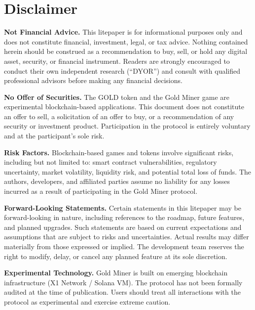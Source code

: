 \documentclass[11pt,a4paper]{article}
\begin{document}
\section*{Disclaimer}

\vspace{1em}

\noindent\textbf{Not Financial Advice.} This litepaper is for informational purposes only and does not constitute financial, investment, legal, or tax advice. Nothing contained herein should be construed as a recommendation to buy, sell, or hold any digital asset, security, or financial instrument. Readers are strongly encouraged to conduct their own independent research (``DYOR'') and consult with qualified professional advisors before making any financial decisions.

\vspace{0.8em}

\noindent\textbf{No Offer of Securities.} The GOLD token and the Gold Miner game are experimental blockchain-based applications. This document does not constitute an offer to sell, a solicitation of an offer to buy, or a recommendation of any security or investment product. Participation in the protocol is entirely voluntary and at the participant's sole risk.

\vspace{0.8em}

\noindent\textbf{Risk Factors.} Blockchain-based games and tokens involve significant risks, including but not limited to: smart contract vulnerabilities, regulatory uncertainty, market volatility, liquidity risk, and potential total loss of funds. The authors, developers, and affiliated parties assume no liability for any losses incurred as a result of participating in the Gold Miner protocol.

\vspace{0.8em}

\noindent\textbf{Forward-Looking Statements.} Certain statements in this litepaper may be forward-looking in nature, including references to the roadmap, future features, and planned upgrades. Such statements are based on current expectations and assumptions that are subject to risks and uncertainties. Actual results may differ materially from those expressed or implied. The development team reserves the right to modify, delay, or cancel any planned feature at its sole discretion.

\vspace{0.8em}

\noindent\textbf{Experimental Technology.} Gold Miner is built on emerging blockchain infrastructure (X1 Network / Solana VM). The protocol has not been formally audited at the time of publication. Users should treat all interactions with the protocol as experimental and exercise extreme caution.
\end{document}
